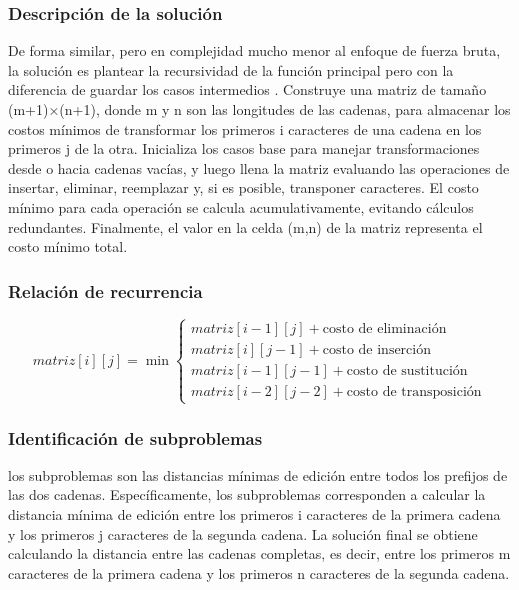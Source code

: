 \subsubsection{Descripción de la solución}

De forma similar, pero en complejidad mucho menor al enfoque de fuerza bruta, la solución es plantear la recursividad de la función principal pero con la diferencia de guardar los casos intermedios . Construye una matriz de tamaño 
(m+1)×(n+1), donde m y n son las longitudes de las cadenas, para almacenar los costos mínimos de transformar los primeros i caracteres de una cadena en los primeros j de la otra. Inicializa los casos base para manejar transformaciones desde o hacia cadenas vacías, y luego llena la matriz evaluando las operaciones de insertar, eliminar, reemplazar y, si es posible, transponer caracteres. El costo mínimo para cada operación se calcula acumulativamente, evitando cálculos redundantes. Finalmente, el valor en la celda (m,n) de la matriz representa el costo mínimo total.

\subsubsection{Relación de recurrencia}

\begin{equation*}
    matriz[i][j] = \min \begin{cases}
    matriz[i-1][j] + \text{costo de eliminación} \\
    matriz[i][j-1] + \text{costo de inserción} \\
    matriz[i-1][j-1] + \text{costo de sustitución}  \\
    matriz[i-2][j-2] + \text{costo de transposición}
    \end{cases}
\end{equation*}


\subsubsection{Identificación de subproblemas}

los subproblemas son las distancias mínimas de edición entre todos los prefijos de las dos cadenas. Específicamente, los subproblemas corresponden a calcular la distancia mínima de edición entre los primeros i caracteres de la primera cadena y los primeros j caracteres de la segunda cadena. La solución final se obtiene calculando la distancia entre las cadenas completas, es decir, entre los primeros m caracteres de la primera cadena y los primeros n caracteres de la segunda cadena.

